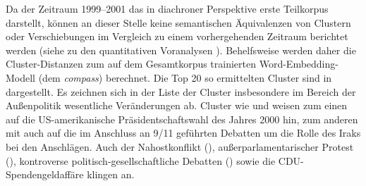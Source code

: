 Da der Zeitraum 1999--2001 das in diachroner Perspektive erste Teilkorpus darstellt, können an dieser Stelle keine semantischen Äquivalenzen von Clustern oder Verschiebungen im Vergleich zu einem vorhergehenden Zeitraum berichtet werden (siehe zu den quantitativen Voranalysen ). Behelfsweise werden daher die Cluster-Distanzen zum auf dem Gesamtkorpus trainierten Word-Embedding-Modell (dem \emph{compass}) berechnet. Die Top 20 so ermittelten Cluster sind in  dargestellt. Es zeichnen sich in der Liste der Cluster insbesondere im Bereich der Außenpolitik wesentliche Veränderungen ab. Cluster wie  und  weisen zum einen auf die US-amerikanische Präsidentschaftswahl des Jahres 2000 hin, zum anderen mit  auch auf die im Anschluss an 9/11 geführten Debatten um die Rolle des Iraks bei den Anschlägen. Auch der Nahostkonflikt (), außerparlamentarischer Protest (), kontroverse politisch-gesellschaftliche Debatten () sowie die CDU-Spendengeldaffäre  klingen an.

